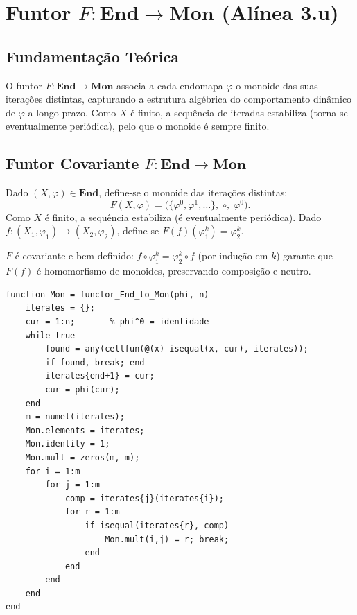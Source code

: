 \section{Funtor $F: \mathbf{End} \to \mathbf{Mon}$ (Alínea 3.u)}
\label{sec:functor-end-mon}

\subsection{Fundamentação Teórica}

O funtor $F: \mathbf{End} \to \mathbf{Mon}$ associa a cada endomapa $\varphi$ o monoide das suas iterações distintas, capturando a estrutura algébrica do comportamento dinâmico de $\varphi$ a longo prazo. Como $X$ é finito, a sequência de iteradas estabiliza (torna-se eventualmente periódica), pelo que o monoide é sempre finito.

\subsection{Funtor Covariante $F: \mathbf{End} \to \mathbf{Mon}$}

\begin{definition}
Dado $(X, \varphi) \in \mathbf{End}$, define-se o monoide das iterações distintas:
\[
    F(X, \varphi) = \bigl(\{\varphi^0, \varphi^1, \ldots\},\;\circ,\;\varphi^0\bigr).
\]
Como $X$ é finito, a sequência estabiliza (é eventualmente periódica). Dado $f: (X_1, \varphi_1) \to (X_2, \varphi_2)$, define-se $F(f)(\varphi_1^k) = \varphi_2^k$.
\end{definition}

\begin{proposition}
$F$ é covariante e bem definido: $f \circ \varphi_1^k = \varphi_2^k \circ f$ (por indução em $k$) garante que $F(f)$ é homomorfismo de monoides, preservando composição e neutro.
\end{proposition}

\begin{lstlisting}[style=matlab, caption={Funtor covariante $F: \mathbf{End} \to \mathbf{Mon}$}]
function Mon = functor_End_to_Mon(phi, n)
    iterates = {};
    cur = 1:n;       % phi^0 = identidade
    while true
        found = any(cellfun(@(x) isequal(x, cur), iterates));
        if found, break; end
        iterates{end+1} = cur;
        cur = phi(cur);
    end
    m = numel(iterates);
    Mon.elements = iterates;
    Mon.identity = 1;
    Mon.mult = zeros(m, m);
    for i = 1:m
        for j = 1:m
            comp = iterates{j}(iterates{i});
            for r = 1:m
                if isequal(iterates{r}, comp)
                    Mon.mult(i,j) = r; break;
                end
            end
        end
    end
end
\end{lstlisting}

